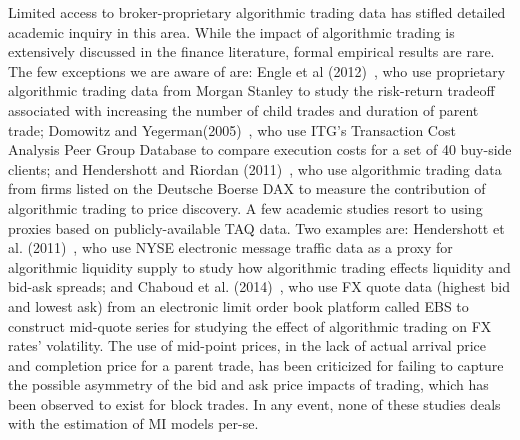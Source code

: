 Limited access to broker-proprietary algorithmic trading data has stifled detailed academic inquiry in this area. While the impact of algorithmic trading is extensively discussed in the finance literature, formal empirical results are rare. The few exceptions we are aware of are: Engle et al (2012)~\cite{engle2012}, who use proprietary algorithmic trading data from Morgan Stanley to study the risk-return tradeoff associated with increasing the number of child trades and duration of parent trade; Domowitz and Yegerman(2005)~\cite{doye}, who use ITG's Transaction Cost Analysis Peer Group Database to compare execution costs for a set of 40 buy-side clients; and Hendershott and Riordan (2011)~\cite{hernderrio}, who use algorithmic trading data from firms listed on the Deutsche Boerse DAX to measure the contribution of algorithmic trading to price discovery. A few academic studies resort to using proxies based on publicly-available TAQ data. Two examples are: Hendershott et al. (2011)~\cite{hender2011}, who use NYSE electronic message traffic data as a proxy for algorithmic liquidity supply to study how algorithmic trading effects liquidity and bid-ask spreads; and Chaboud et al. (2014)~\cite{chaboud}, who use FX quote data (highest bid and lowest ask) from an electronic limit order book platform called EBS to construct mid-quote series for studying the effect of algorithmic trading on FX rates' volatility. The use of mid-point prices, in the lack of actual arrival price and completion price for a parent trade, has been criticized for failing to capture the possible asymmetry of the bid and ask price impacts of trading, which has been observed to exist for block trades. In any event, none of these studies deals with the estimation of MI models per-se.


